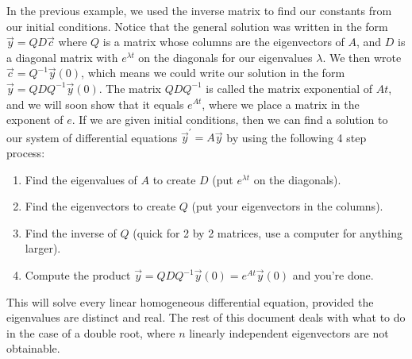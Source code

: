 \documentclass[10pt]{article}
\theoremstyle{plain}
\theoremstyle{box}
\begin{document}
In the previous example, we used the inverse matrix to find our constants from our initial conditions.  Notice that the general solution was written in the form $\vec y = QD\vec c$ where $Q$ is a matrix whose columns are the eigenvectors of $A$, and $D$ is a diagonal matrix with $e^{\lambda t}$ on the diagonals for our eigenvalues $\lambda$.  We then wrote $\vec c = Q^{-1}\vec y(0)$, which means we could write our solution in the form 
$\vec y = QDQ^{-1}\vec y(0)$. The matrix $QDQ^{-1}$ is called the matrix exponential of $At$, and we will soon show that it equals $e^{At}$, where we place a matrix in the exponent of $e$. If we are given initial conditions, then we can find a solution to our system of differential equations $\vec y^\prime = A\vec y$ by using the following 4 step process: 
\begin{enumerate}
	\item Find the eigenvalues of $A$ to create $D$ (put $e^{\lambda t}$ on the diagonals).
	\item Find the eigenvectors to create $Q$ (put your eigenvectors in the columns).
	\item Find the inverse of $Q$ (quick for 2 by 2 matrices, use a computer for anything larger).
	\item Compute the product $\vec y = QDQ^{-1}\vec y(0) = e^{At}\vec y(0)$ and you're done. 
\end{enumerate}
This will solve every linear homogeneous differential equation, provided the eigenvalues are distinct and real. The rest of this document deals with what to do in the case of a double root, where $n$ linearly independent eigenvectors are not obtainable. 
\end{document}
